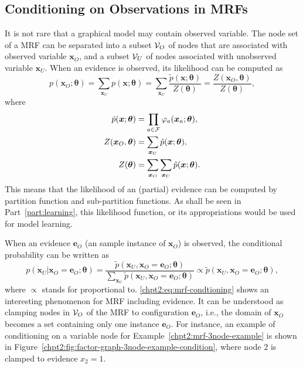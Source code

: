 \subsection{Conditioning on Observations in MRFs}
It is not rare that a graphical model may contain observed variable. The node set of a MRF can be separated into a subset $\mathcal{V}_O$ of nodes that are associated with observed variable $\bm{x}_O$, and a subset $\mathcal{V}_U$ of nodes associated with unobserved variable $\bm{x}_U$. When an evidence is observed, its likelihood can be computed as
\begin{equation}
  p(\bm{x}_O;\bm{\theta}) = \sum_{\bm{x}_U} p(\bm{x};\bm{\theta}) =\sum_{\bm{x}_U}\frac{\tilde{p}(\bm{x}; \bm{\theta})}{Z(\bm{\theta})} = \frac{Z(\bm{x}_O,\bm{\theta})}{Z(\bm{\theta})},
\end{equation}
where 
\begin{align}
  \tilde{p}(\bm{x}; \bm{\theta}) &= \prod_{a \in \mathcal{F}} \varphi_{a}(\bm{x}_{a};\bm{\theta}), \nonumber \\
  Z(\bm{x}_O, \bm{\theta}) &= \sum_{\bm{x}_U} \tilde{p}(\bm{x}; \bm{\theta}), \nonumber \\
  Z(\bm{\theta}) &= \sum_{\bm{x}_O}\sum_{\bm{x}_U} \tilde{p}(\bm{x}; \bm{\theta}).
\end{align}
This means that the likelihood of an (partial) evidence can be computed by partition function and sub-partition functions. As shall be seen in Part~\ref{part:learning}, this likelihood function, or its appropriations would be used for model learning.

 When an evidence $\bm{e}_O$ (an sample instance of $\bm{x}_O$) is observed, the conditional probability can be written as
\begin{equation}\label{chpt2:eq:mrf-condtioning}
  p(\bm{x}_U|\bm{x}_O=\bm{e}_O;\bm{\theta}) = \frac{\tilde{p}(\bm{x}_U, \bm{x}_O = \bm{e}_O; \bm{\theta})}{\sum_{\bm{x}_U}\tilde{p}(\bm{x}_U, \bm{x}_O = \bm{e}_O; \bm{\theta})} \propto \tilde{p}(\bm{x}_U, \bm{x}_O = \bm{e}_O; \bm{\theta}),
\end{equation}
where $\propto$ stands for proportional to. \eqref{chpt2:eq:mrf-condtioning} shows an interesting phenomenon for MRF including evidence. It can be understood as clamping nodes in $\mathcal{V}_O$ of the MRF to configuration $\bm{e}_O$, i.e., the domain of $\bm{x}_O$ becomes a set containing only one instance $\bm{e}_O$. For instance, an example of conditioning on a variable node for Example~\ref{chpt2:mrf-3node-example} is shown in Figure~\ref{chpt2:fig:factor-graph-3node-example-condition}, where node $2$ is clamped to evidence $x_2=1$.



